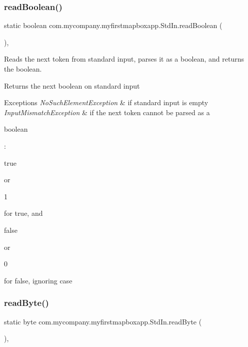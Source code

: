 \subsubsection{\texorpdfstring{read\+Boolean()}{readBoolean()}}
{\footnotesize\ttfamily static boolean com.\+mycompany.\+myfirstmapboxapp.\+Std\+In.\+read\+Boolean (\begin{DoxyParamCaption}{ }\end{DoxyParamCaption})\hspace{0.3cm}{\ttfamily [inline]}, {\ttfamily [static]}}

Reads the next token from standard input, parses it as a boolean, and returns the boolean.

\begin{DoxyReturn}{Returns}
the next boolean on standard input 
\end{DoxyReturn}

\begin{DoxyExceptions}{Exceptions}
{\em No\+Such\+Element\+Exception} & if standard input is empty \\
\hline
{\em Input\+Mismatch\+Exception} & if the next token cannot be parsed as a
\begin{DoxyCode}
\textcolor{keywordtype}{boolean} 
\end{DoxyCode}
 \+: 
\begin{DoxyCode}
\textcolor{keyword}{true} 
\end{DoxyCode}
 or
\begin{DoxyCode}
1 
\end{DoxyCode}
 for true, and
\begin{DoxyCode}
\textcolor{keyword}{false} 
\end{DoxyCode}
 or
\begin{DoxyCode}
0 
\end{DoxyCode}
 for false, ignoring case \\
\hline
\end{DoxyExceptions}
\mbox{\label{classcom_1_1mycompany_1_1myfirstmapboxapp_1_1_std_in_a1b98437306082b452b93f976072bb213}} 
\subsubsection{\texorpdfstring{read\+Byte()}{readByte()}}
{\footnotesize\ttfamily static byte com.\+mycompany.\+myfirstmapboxapp.\+Std\+In.\+read\+Byte (\begin{DoxyParamCaption}{ }\end{DoxyParamCaption})\hspace{0.3cm}{\ttfamily [inline]}, {\ttfamily [static]}}

